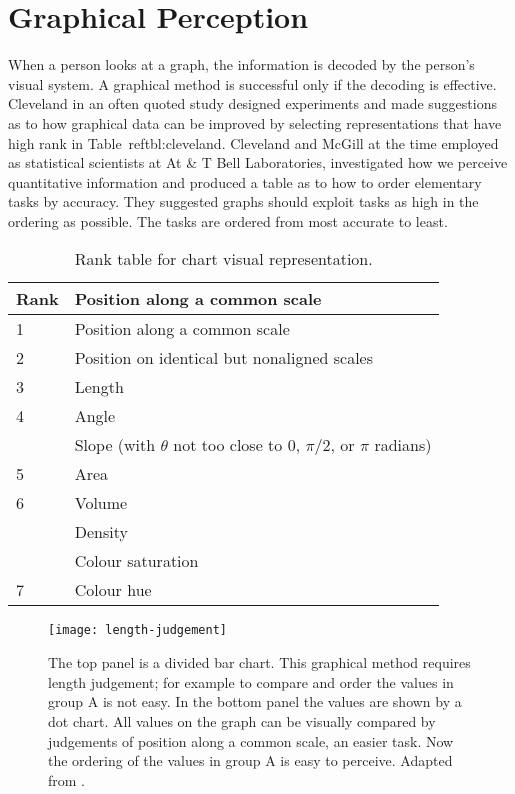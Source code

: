 \section{Graphical Perception}

When a person looks at a graph, the information is decoded by the person’s visual system. A graphical method is successful only if the decoding is effective. Cleveland \cite{cleveland1985} in an often quoted study designed experiments and made suggestions as to how graphical data can be improved by selecting representations that have high rank in Table~ref{tbl:cleveland}. Cleveland and McGill at the time employed as statistical scientists at At \& T Bell Laboratories, investigated how we perceive quantitative information and produced a table as to how to order elementary tasks by accuracy. They suggested graphs should exploit tasks as high in the ordering as possible. The tasks are ordered from most accurate to least.


\begin{longtable}[c]{l>{\RaggedRight}p{7.5cm}}
\caption{Rank table for chart visual representation.}\label{tbl:ranktable} \\
\toprule
Rank  & Position along a common scale\\
\midrule
1  & Position along a common scale\\
2  & Position on identical but nonaligned scales\\
3  & Length\\
4  & Angle\\
    & Slope (with $\theta$ not too close to 0, $\pi/2$, or $\pi$ radians)\\
5   & Area\\
6   &Volume\\
     &Density\\
     &Colour saturation\\
7   & Colour hue\\         
\bottomrule
\end{longtable}





\begin{figure}[htbp]
\texttt{[image: length-judgement]}
\caption{The top panel is a divided bar chart. This graphical method requires length judgement; for example
to compare and order the values in group A is not easy. In the bottom panel the values are shown by a dot
chart. All values on the graph can be visually compared by judgements of position along a common scale, an
easier task. Now the ordering of the values in group A is easy to perceive. Adapted from \cite{cleveland1985}.}
\end{figure}

